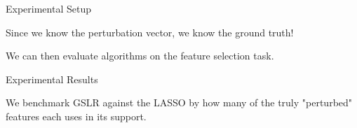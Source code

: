 \documentclass[svgnames,final]{beamer}
\begin{document}
\begin{frame}
\begin{columns}[T]
\begin{column}{.3\linewidth}
\begin{block}{Experimental Setup}
\begin{figure}[h]
		\end{figure}


		Since we know the perturbation vector, we know the ground truth!

		We can then evaluate algorithms on the feature selection task.

	\end{block}

	\vspace{1.0cm}

	\begin{block}{Experimental Results}

		We benchmark GSLR against the LASSO by how many of the truly "perturbed" features each uses in its support.


\end{block}
\end{column}
\end{columns}
\end{frame}
\end{document}
